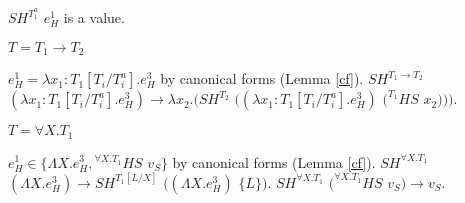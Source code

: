 \begin{case}
\begin{subcase}
$SH^{T_{1}^{a}}$ $e_{H}^{1}$ is a value.

\end{subcase}

\begin{subcase}

$T=T_{1}\rightarrow T_{2}$

$e_{H}^{1}=\lambda x_{1}:T_{1}[T_{i}/T_{i}^{a}].e_{H}^{3}$ by canonical forms (Lemma \ref{cf}).  $SH^{T_{1}\rightarrow T_{2}}$ $(\lambda x_{1}:T_{1}[T_{i}/T_{i}^{a}].e_{H}^{3})\rightarrow\lambda x_{2}.(SH^{T_{2}}$ $((\lambda x_{1}:T_{1}[T_{i}/T_{i}^{a}].e_{H}^{3})$ $(^{T_{1}}HS$ $x_{2})))$.

\end{subcase}

\begin{subcase}

$T=\forall X.T_{1}$

$e_{H}^{1}\in\lbrace\Lambda X.e_{H}^{3},{^{\forall X.T_{1}}H}S$ $v_{S}\rbrace$ by canonical forms (Lemma \ref{cf}).  $SH^{\forall X.T_{1}}$ $(\Lambda X.e_{H}^{3})\rightarrow SH^{T_{1}[L/X]}$ $((\Lambda X.e_{H}^{3})$ $\lbrace L\rbrace)$.  $SH^{\forall X.T_{1}}$ $(^{\forall X.T_{1}}HS$ $v_{S})\rightarrow v_{S}$.

\end{subcase}

\end{case}